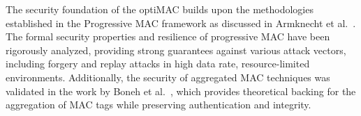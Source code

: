 The security foundation of the optiMAC builds upon the methodologies established in the Progressive MAC framework as discussed in Armknecht et al.~\cite{ProMAC1}. The formal security properties and resilience of progressive MAC have been rigorously analyzed, providing strong guarantees against various attack vectors, including forgery and replay attacks in high data rate, resource-limited environments. Additionally, the security of aggregated MAC techniques was validated in the work by Boneh et al.~\cite{boneh2003aggregate}, which provides theoretical backing for the aggregation of MAC tags while preserving authentication and integrity.






    
